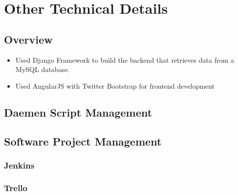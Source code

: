 \chapter{Other Technical Details}

\section{Overview}
\begin{itemize}
\item Used Django Framework to build the backend that retrieves data from a MySQL database.

\item Used AngularJS with Twitter Bootstrap for frontend development
\end{itemize}

\section{Daemen Script Management}
\section{Software Project Management}
\subsection{Jenkins}
\subsection{Trello}
